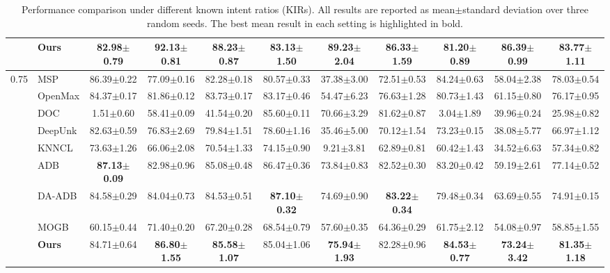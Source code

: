 \documentclass[11pt]{article}
\begin{document}
\begin{table}[!t]
\begin{tabular*}{\textwidth}{
@{\extracolsep{\fill}}
c l
ccc
ccc
ccc
@{}
}
& \textbf{Ours}
& 82.98$\pm$0.79
& \textbf{92.13$\pm$0.81}
& \textbf{88.23$\pm$0.87}
& 83.13$\pm$1.50
& \textbf{89.23$\pm$2.04}
& 86.33$\pm$1.59
& \textbf{81.20$\pm$0.89}
& \textbf{86.39$\pm$0.99}
& \textbf{83.77$\pm$1.11} \\

\midrule

\multirow{9}{*}{0.75}
& MSP
& 86.39$\pm$0.22 & 77.09$\pm$0.16 & 82.28$\pm$0.18
& 80.57$\pm$0.33 & 37.38$\pm$3.00 & 72.51$\pm$0.53
& 84.24$\pm$0.63 & 58.04$\pm$2.38 & 78.03$\pm$0.54 \\

& OpenMax
& 84.37$\pm$0.17 & 81.86$\pm$0.12 & 83.73$\pm$0.17
& 83.17$\pm$0.46 & 54.47$\pm$6.23 & 76.63$\pm$1.28
& 80.73$\pm$1.43 & 61.15$\pm$0.80 & 76.17$\pm$0.95 \\

& DOC
& 1.51$\pm$0.60 & 58.41$\pm$0.09 & 41.54$\pm$0.20
& 85.60$\pm$0.11 & 70.66$\pm$3.29 & 81.62$\pm$0.87
& 3.04$\pm$1.89 & 39.96$\pm$0.24 & 25.98$\pm$0.82 \\

& DeepUnk
& 82.63$\pm$0.59 & 76.83$\pm$2.69 & 79.84$\pm$1.51
& 78.60$\pm$1.16 & 35.46$\pm$5.00 & 70.12$\pm$1.54
& 73.23$\pm$0.15 & 38.08$\pm$5.77 & 66.97$\pm$1.12 \\

& KNNCL
& 73.63$\pm$1.26 & 66.06$\pm$2.08 & 70.54$\pm$1.33
& 74.15$\pm$0.90 & 9.21$\pm$3.81 & 62.89$\pm$0.81
& 60.42$\pm$1.43 & 34.52$\pm$6.63 & 57.34$\pm$0.82 \\

& ADB
& \textbf{87.13$\pm$0.09} & 82.98$\pm$0.96 & 85.08$\pm$0.48
& 86.47$\pm$0.36 & 73.84$\pm$0.83 & 82.52$\pm$0.30
& 83.20$\pm$0.42 & 59.19$\pm$2.61 & 77.14$\pm$0.52 \\

& DA-ADB
& 84.58$\pm$0.29 & 84.04$\pm$0.73 & 84.53$\pm$0.51
& \textbf{87.10$\pm$0.32}
& 74.69$\pm$0.90
& \textbf{83.22$\pm$0.34}
& 79.48$\pm$0.34 & 63.69$\pm$0.55 & 74.91$\pm$0.15 \\

& MOGB
& 60.15$\pm$0.44 & 71.40$\pm$0.20 & 67.20$\pm$0.28
& 68.54$\pm$0.79 & 57.60$\pm$0.35 & 64.36$\pm$0.29
& 61.75$\pm$2.12 & 54.08$\pm$0.97 & 58.85$\pm$1.55 \\

& \textbf{Ours}
& 84.71$\pm$0.64
& \textbf{86.80$\pm$1.55}
& \textbf{85.58$\pm$1.07}
& 85.04$\pm$1.06
& \textbf{75.94$\pm$1.93}
& 82.28$\pm$0.96
& \textbf{84.53$\pm$0.77}
& \textbf{73.24$\pm$3.42}
& \textbf{81.35$\pm$1.18} \\

\bottomrule
\end{tabular*}

\caption{Performance comparison under different known intent ratios (KIRs). All results are reported as mean$\pm$standard deviation over three random seeds. The best mean result in each setting is highlighted in bold.}
\label{tab:main_results_all}
\end{table}
\end{document}
